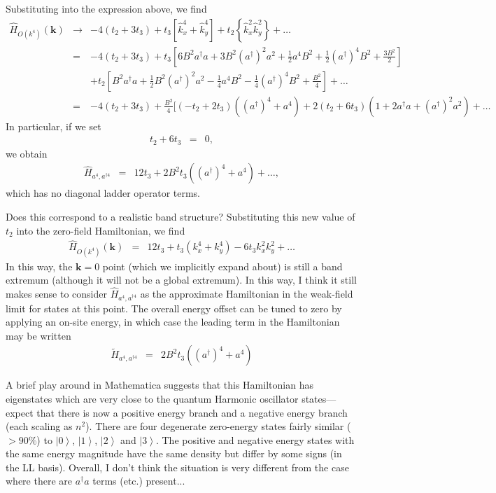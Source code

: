 \documentclass[a4paper, 10pt]{paper}
\newcommand{\be}{\begin{eqnarray*}}
\newcommand{\ee}{\end{eqnarray*}}
\newcommand{\bk}{{\mathbf{k}}}
\newcommand{\h}{\hat{H}}
\newcommand{\ket}[1]{\left|{#1}\right\rangle}
\begin{document}
Substituting into the expression above, we find
\be
\h_{O(k^4)}(\bk)&\to&-4\left(t_2+3t_3\right)+t_3\left[\hat{k}_x^4+\hat{k}_y^4\right]+t_2\left\{\hat{k}_x^2\hat{k}_y^2\right\}+\ldots\\
&=&-4\left(t_2+3t_3\right)+t_3\left[6 {B}^2 a^\dagger  a+3 {B}^2 \left(a^\dagger\right) ^2 a^2+\frac{1}{2} a^4 {B}^2+\frac{1}{2} \left(a^\dagger\right) ^4 {B}^2+\frac{3 {B}^2}{2}\right]\\
&&+t_2\left[{B}^2 a^\dagger  a+\frac{1}{2} {B}^2 \left(a^\dagger\right) ^2 a^2-\frac{1}{4} a^4 {B}^2-\frac{1}{4} \left(a^\dagger \right)^4 {B}^2+\frac{{B}^2}{4}\right]+\ldots\\
&=&-4\left(t_2+3t_3\right)+\frac{B^2}{4}\bigg[\left(-t_2+2t_3\right)\left(\left(a^\dagger\right) ^4+a^4\right)+2\left(t_2+6t_3\right)\left(1+2a^\dagger a + \left(a^\dagger\right)^2a^2\right)+\ldots
\ee
In particular, if we set 
\be
t_2+6t_3&=&0,
\ee
we obtain
\be
\h_{a^4,a^{\dagger4}}&=&12t_3+2B^2t_3\left(\left(a^\dagger\right) ^4+a^4\right)+\ldots,
\ee
which has no diagonal ladder operator terms.

Does this correspond to a realistic band structure? Substituting this new value of $t_2$ into the zero-field Hamiltonian, we find
\be
\h_{O(k^4)}(\bk)&=&12t_3+t_3\left(k_x^4+k_y^4\right)-6t_3k_x^2k_y^2+\ldots
\ee
In this way, the $\bk=0$ point (which we implicitly expand about) is still a band extremum (although it will not be a global extremum). In this way, I think it still makes sense to consider $\h_{a^4,a^{\dagger4}}$ as the approximate Hamiltonian in the weak-field limit for states at this point. The overall energy offset can be tuned to zero by applying an on-site energy, in which case the leading term in the Hamiltonian may be written
\be
\tilde{H}_{a^4,a^{\dagger4}}&=&2B^2t_3\left(\left(a^\dagger\right) ^4+a^4\right)
\ee

A brief play around in Mathematica suggests that this Hamiltonian has eigenstates which are very close to the quantum Harmonic oscillator states---expect that there is now a positive energy branch and a negative energy branch (each scaling as $n^2$). There are four degenerate zero-energy states fairly similar ($>90\%$) to $\ket{0}$, $\ket{1}$, $\ket{2}$ and $\ket{3}$. The positive and negative energy states with the same energy magnitude have the same density but differ by some signs (in the LL basis). Overall, I don't think the situation is very different from the case where there are $a^\dagger a$ terms (etc.) present...
\end{document}

